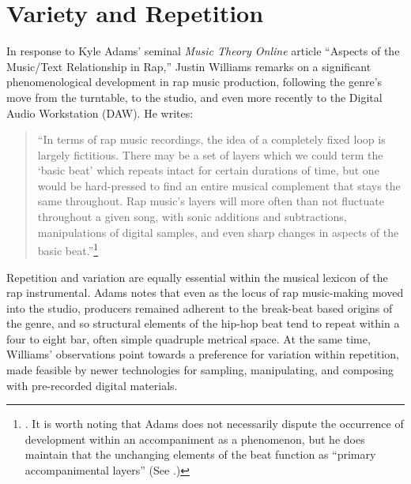 \onehalfspacing 
\label{chapter2}
\section{Variety and Repetition}
In response to Kyle Adams' seminal \textit{Music Theory Online} article ``Aspects of the Music/Text
Relationship in Rap,'' Justin Williams remarks on a significant phenomenological development in rap 
music production, following the genre's move from the turntable, to the studio, and even more recently
to the Digital Audio Workstation (DAW). He writes:

\begin{quote}
    \small ``In terms of rap music recordings, the idea of a completely fixed loop is largely fictitious.
    There may be a set of layers which we could term the `basic beat' which repeats intact for certain
    durations of time, but one would be hard-pressed to find an entire musical complement that stays the 
    same throughout. Rap music’s layers will more often than not fluctuate throughout a given song, with
    sonic additions and subtractions, manipulations of digital samples, and even sharp changes in aspects 
    of the basic beat.''\footnote{\cite{justinawilliamsBeatsFlowsResponse2009}. It is worth noting that 
    Adams does not necessarily dispute the occurrence of development within an accompaniment as a phenomenon,
    but he does maintain that the unchanging elements of the beat function as ``primary accompanimental
    layers'' (See \cite{kyleadamsPeopleInstinctiveAssumptions2009}.)}
\end{quote}

\noindent \normalsize Repetition and variation are equally essential within the musical lexicon of 
the rap instrumental. Adams notes that even as the locus of rap music-making moved into the studio, 
producers remained adherent to the break-beat based origins of the genre, and so structural elements of 
the hip-hop beat tend to repeat within a four to eight bar, often simple quadruple metrical space. At the
same time, Williams' observations point towards a preference for variation within repetition, made 
feasible by newer technologies for sampling, manipulating, and composing with pre-recorded digital 
materials.

